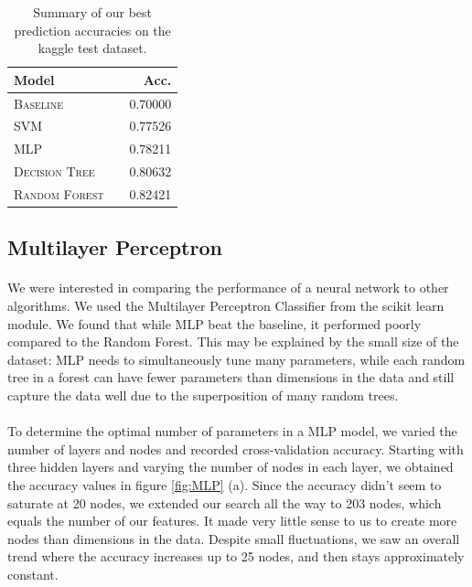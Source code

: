 \documentclass[11pt]{article}
\begin{document}
  \begin{table}
\centering
\begin{tabular}{llr}
 \toprule
 Model &  & Acc. \\
 \midrule
 \textsc{Baseline} & & 0.70000\\
 \textsc{SVM} & & 0.77526 \\
 \textsc{MLP} & & 0.78211 \\
 \textsc{Decision Tree} & & 0.80632\\
  \textsc{Random Forest} & &0.82421\\
 \bottomrule
\end{tabular}
\caption{\label{tab:results} Summary of our best prediction accuracies on the kaggle test dataset.}
\end{table}

\subsection{Multilayer Perceptron}
\paragraph{}We were interested in comparing the performance of a neural network to other algorithms. We used the Multilayer Perceptron Classifier from the scikit learn module. We found that while MLP beat the baseline, it performed poorly compared to the Random Forest. This may be explained by the small size of the dataset: MLP needs to simultaneously tune many parameters, while each random tree in a forest can have fewer parameters than dimensions in the data and still capture the data well due to the superposition of many random trees.

\paragraph{}To determine the optimal number of parameters in a MLP model, we varied the number of layers and nodes and recorded cross-validation accuracy. Starting with three hidden layers and varying the number of nodes in each layer, we obtained the accuracy values in figure \ref{fig:MLP} (a). Since the accuracy didn't seem to saturate at 20 nodes, we extended our search all the way to 203 nodes, which equals the number of our features. It made very little sense to us to create more nodes than dimensions in the data. Despite small fluctuations, we saw an overall trend where the accuracy increases up to 25 nodes, and then stays approximately constant. 
\end{document}

